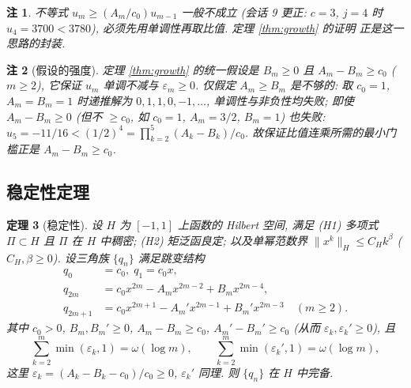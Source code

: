 \documentclass[UTF8]{ctexart}
\newtheorem{theorem}{定理}[section]
\newtheorem{remark}[theorem]{注}
\begin{document}
\begin{remark}
	不等式 $u_m \geq (A_m/c_0)u_{m-1}$ 一般不成立 (会话 9 更正: $c=3$, $j=4$ 时
	$u_4 = 3700 < 3780$), 必须先用单调性再取比值. 定理 \ref{thm:growth} 的证明
	正是这一思路的封装.
\end{remark}
\begin{remark}[假设的强度]
	定理 \ref{thm:growth} 的统一假设是 $B_m \geq 0$ 且 $A_m - B_m \geq c_0$
	($m \geq 2$), 它保证 $u_m$ 单调不减与 $\varepsilon_m \geq 0$.
	仅假定 $A_m \geq B_m$ 是不够的: 取 $c_0 = 1$, $A_m = B_m = 1$ 时递推解为
	$0, 1, 1, 0, -1, \dots$, 单调性与非负性均失败; 即使 $A_m - B_m \geq 0$
	(但不 $\geq c_0$, 如 $c_0 = 1$, $A_m = 3/2$, $B_m = 1$) 也失败:
	$u_5 = -11/16 < (1/2)^4 = \prod_{k=2}^{5}(A_k - B_k)/c_0$.
	故保证比值连乘所需的最小门槛正是 $A_m - B_m \geq c_0$.
\end{remark}

\subsection{稳定性定理}

\begin{theorem}[稳定性]\label{thm:stability}
	设 $H$ 为 $[-1,1]$ 上函数的 Hilbert 空间, 满足 (H1) 多项式 $\Pi \subset H$
	且 $\Pi$ 在 $H$ 中稠密; (H2) 矩泛函良定; 以及单幂范数界
	$\|x^k\|_H \leq C_H k^\beta$ ($C_H, \beta \geq 0$). 设三角族
	$\{q_n\}$ 满足跳变结构
	\begin{equation}
	\begin{aligned}
		q_0 &= c_0,\; q_1 = c_0 x, \\
		q_{2m} &= c_0 x^{2m} - A_m x^{2m-2} + B_m x^{2m-4}, \\
		q_{2m+1} &= c_0 x^{2m+1} - A_m' x^{2m-1} + B_m' x^{2m-3} \quad (m \geq 2).
	\end{aligned}
	\end{equation}
	其中 $c_0 > 0$, $B_m, B_m' \geq 0$, $A_m - B_m \geq c_0$, $A_m' - B_m' \geq c_0$ (从而 $\varepsilon_k, \varepsilon_k' \geq 0$),
	且
	\begin{equation}
		\sum_{k=2}^{m} \min(\varepsilon_k, 1) = \omega(\log m),
		\qquad \sum_{k=2}^{m} \min(\varepsilon_k', 1) = \omega(\log m),
	\end{equation}
	这里 $\varepsilon_k = (A_k - B_k - c_0)/c_0 \geq 0$, $\varepsilon_k'$ 同理. 则
	$\{q_n\}$ 在 $H$ 中完备.
\end{theorem}
\end{document}

